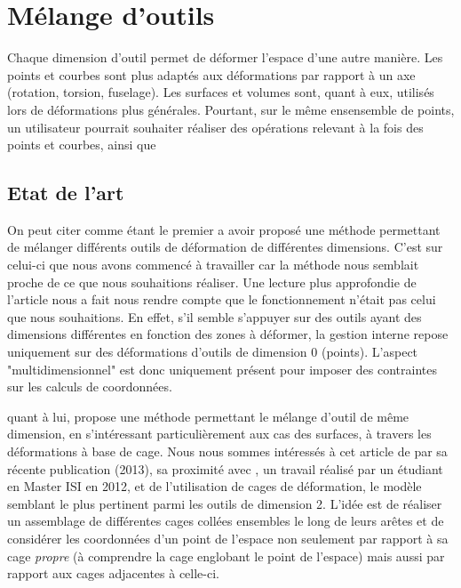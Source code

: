 
\chapter{Mélange d'outils}

\graphicspath{ {Chapter2/Chapter2Figs/PNG/}
  {Chapter2/Chapter2Figs/PDF/} {Chapter2/Chapter2Figs/} }

Chaque dimension d'outil permet de déformer l'espace d'une autre
manière. Les points et courbes sont plus adaptés aux déformations par
rapport à un axe (rotation, torsion, fuselage). Les surfaces et
volumes sont, quant à eux, utilisés lors de déformations plus
générales. Pourtant, sur le même ensensemble de points, un utilisateur
pourrait souhaiter réaliser des opérations relevant à la fois des
points et courbes, ainsi que 

\section{Etat de l'art}

On peut citer \cite{JBPS11} comme étant le premier a avoir proposé une
méthode permettant de mélanger différents outils de déformation de
différentes dimensions.  C'est sur celui-ci que nous avons commencé à
travailler car la méthode nous semblait proche de ce que nous
souhaitions réaliser. Une lecture plus approfondie de l'article nous a
fait nous rendre compte que le fonctionnement n'était pas celui que
nous souhaitions.  En effet, s'il semble s'appuyer sur des outils
ayant des dimensions différentes en fonction des zones à déformer, la
gestion interne repose uniquement sur des déformations d'outils de
dimension 0 (points).  L'aspect "multidimensionnel" est donc
uniquement présent pour imposer des contraintes sur les calculs de
coordonnées.


\cite{GPCP13} quant à lui, propose une méthode permettant le mélange
d'outil de même dimension, en s'intéressant particulièrement aux cas
des surfaces, à travers les déformations à base de cage. Nous nous
sommes intéressés à cet article de par sa récente publication (2013),
sa proximité avec \cite{Hur12}, un travail réalisé par un étudiant en
Master ISI en 2012, et de l'utilisation de cages de déformation, le
modèle semblant le plus pertinent parmi les outils de dimension
2. L'idée est de réaliser un assemblage de différentes cages collées
ensembles le long de leurs arêtes et de considérer les coordonnées
d'un point de l'espace non seulement par rapport à sa cage
\textit{propre} (à comprendre la cage englobant le point de l'espace)
mais aussi par rapport aux cages adjacentes à celle-ci.



